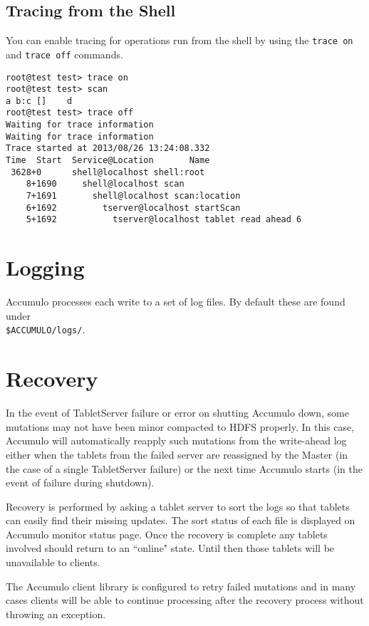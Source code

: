 \subsection{Tracing from the Shell}
You can enable tracing for operations run from the shell by using the
\texttt{trace on} and \texttt{trace off} commands.

\begingroup\fontsize{8pt}{8pt}\selectfont\begin{verbatim}
root@test test> trace on
root@test test> scan
a b:c []    d
root@test test> trace off
Waiting for trace information
Waiting for trace information
Trace started at 2013/08/26 13:24:08.332
Time  Start  Service@Location       Name
 3628+0      shell@localhost shell:root
    8+1690     shell@localhost scan
    7+1691       shell@localhost scan:location
    6+1692         tserver@localhost startScan
    5+1692           tserver@localhost tablet read ahead 6
\end{verbatim}\endgroup

\section{Logging}
Accumulo processes each write to a set of log files. By default these are found under\\
\texttt{\$ACCUMULO/logs/}.

\section{Recovery}

In the event of TabletServer failure or error on shutting Accumulo down, some
mutations may not have been minor compacted to HDFS properly. In this case,
Accumulo will automatically reapply such mutations from the write-ahead log
either when the tablets from the failed server are reassigned by the Master (in the
case of a single TabletServer failure) or the next time Accumulo starts (in the event of
failure during shutdown).

Recovery is performed by asking a tablet server to sort the logs so that tablets can easily find their missing
updates. The sort status of each file is displayed on
Accumulo monitor status page. Once the recovery is complete any
tablets involved should return to an ``online" state. Until then those tablets will be
unavailable to clients.

The Accumulo client library is configured to retry failed mutations and in many
cases clients will be able to continue processing after the recovery process without
throwing an exception.

